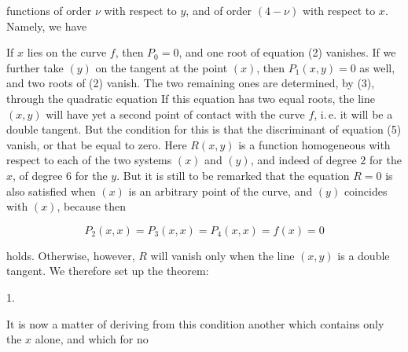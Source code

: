 functions of order $\nu$ with respect to $y$, and of order $(4-\nu)$ with respect to $x$. Namely, we have


If $x$ lies on the curve $f$, then $P_0=0$, and one root of equation (2) vanishes. If we further take $(y)$ on the tangent at the point $(x)$, then $P_1(x,y)=0$ as well, and two roots of (2) vanish. The two remaining ones are determined, by (3), through the quadratic equation
If this equation has two equal roots, the line $(x,y)$ will have yet a second point of contact with the curve $f$, i.\,e. it will be a double tangent. But the condition for this is that the discriminant of equation (5) vanish, or that
be equal to zero. Here $R(x,y)$ is a function homogeneous with respect to each of the two systems $(x)$ and $(y)$, and indeed of degree $2$ for the $x$, of degree $6$ for the $y$. But it is still to be remarked that the equation $R=0$ is also satisfied when $(x)$ is an arbitrary point of the curve, and $(y)$ coincides with $(x)$, because then

\[
P_2(x,x)=P_3(x,x)=P_4(x,x)=f(x)=0
\]

holds. Otherwise, however, $R$ will vanish only when the line $(x,y)$ is a double tangent. We therefore set up the theorem:

1. 

It is now a matter of deriving from this condition another which contains only the $x$ alone, and which for no
